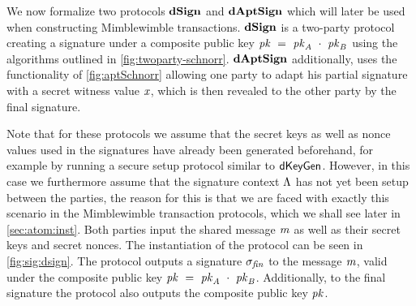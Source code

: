 We now formalize two protocols $\mathbf{dSign}$ and $\mathbf{dAptSign}$ which will later be used when constructing Mimblewimble transactions.
$\mathbf{dSign}$ is a two-party protocol creating a signature under a composite public key $\mathit{pk} ~=~ \mathit{pk}_{\mathit{A}} ~\cdot~ \mathit{pk}_{\mathit{B}}$ using the algorithms outlined in \cref{fig:twoparty-schnorr}.
$\mathbf{dAptSign}$ additionally, uses the functionality of \cref{fig:aptSchnorr} allowing one party to adapt his partial signature with a secret witness value $\mathit{x}$, which is then revealed to the other party by the final signature.

Note that for these protocols we assume that the secret keys as well as nonce values used in the signatures have already been generated beforehand, for example by running a secure setup protocol similar to $\mathsf{dKeyGen}$.
However, in this case we furthermore assume that the signature context $\Lambda$ has not yet been setup between the parties, the reason for this is that we are faced with exactly this scenario in the Mimblewimble transaction protocols, which we shall see later in \cref{sec:atom:inst}.
Both parties input the shared message $\mathit{m}$ as well as their secret keys and secret nonces.
The instantiation of the protocol can be seen in \cref{fig:sig:dsign}.
The protocol outputs a signature $\sigma_{\mathit{fin}}$ to the message $\mathit{m}$, valid under the composite public key $\mathit{pk} ~=~ \mathit{pk}_{\mathit{A}} ~\cdot~ \mathit{pk}_{\mathit{B}}$.
Additionally, to the final signature the protocol also outputs the composite public key $\mathit{pk}$.

